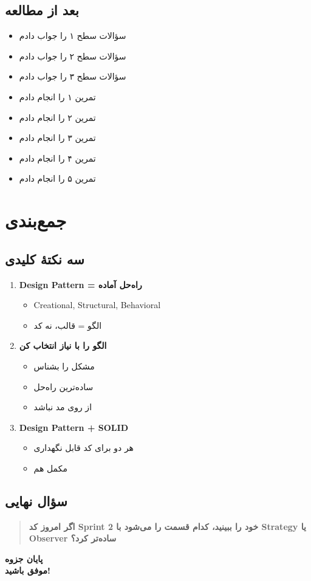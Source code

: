 \documentclass[12pt, a4paper]{article}
\begin{document}
\subsection{بعد از مطالعه}
\begin{itemize}
    \item[$\square$] سؤالات سطح ۱ را جواب دادم
    \item[$\square$] سؤالات سطح ۲ را جواب دادم
    \item[$\square$] سؤالات سطح ۳ را جواب دادم
    \item[$\square$] تمرین ۱ را انجام دادم
    \item[$\square$] تمرین ۲ را انجام دادم
    \item[$\square$] تمرین ۳ را انجام دادم
    \item[$\square$] تمرین ۴ را انجام دادم
    \item[$\square$] تمرین ۵ را انجام دادم
\end{itemize}

\section{جمع‌بندی}

\subsection{سه نکتهٔ کلیدی}
\begin{enumerate}
    \item \textbf{Design Pattern = راه‌حل آماده}
    \begin{itemize}
        \item Creational, Structural, Behavioral
        \item الگو = قالب، نه کد
    \end{itemize}
    \item \textbf{الگو را با نیاز انتخاب کن}
    \begin{itemize}
        \item مشکل را بشناس
        \item ساده‌ترین راه‌حل
        \item از روی مد نباشد
    \end{itemize}
    \item \textbf{Design Pattern + SOLID}
    \begin{itemize}
        \item هر دو برای کد قابل نگهداری
        \item مکمل هم
    \end{itemize}
\end{enumerate}

\subsection{سؤال نهایی}
\begin{quote}
\textbf{اگر امروز کد Sprint 2 خود را ببینید، کدام قسمت را می‌شود با 
Strategy یا Observer ساده‌تر کرد؟}
\end{quote}

\vspace{1cm}

\begin{center}
\textbf{\Large پایان جزوه}\\[0.5cm]
\textbf{\Large موفق باشید!}
\end{center}
\end{document}
